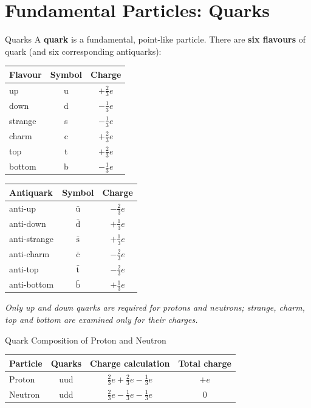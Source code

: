 \section{Fundamental Particles: Quarks}

\begin{definitionbox}{Quarks}
A \textbf{quark} is a fundamental, point-like particle. There are \textbf{six flavours} of quark (and six corresponding antiquarks):
\begin{center}
\renewcommand{\arraystretch}{1.4}
\begin{tabular}{@{} l c c @{}}
\toprule
\textbf{Flavour} & \textbf{Symbol} & \textbf{Charge} \\
\midrule
up    & u & $+\tfrac{2}{3}e$ \\
down  & d & $-\tfrac{1}{3}e$ \\
strange & s & $-\tfrac{1}{3}e$ \\
charm & c & $+\tfrac{2}{3}e$ \\
top   & t & $+\tfrac{2}{3}e$ \\
bottom & b & $-\tfrac{1}{3}e$ \\
\bottomrule
\end{tabular}
\qquad
\begin{tabular}{@{} l c c @{}}
\toprule
\textbf{Antiquark} & \textbf{Symbol} & \textbf{Charge} \\
\midrule
anti-up    & $\bar{\text{u}}$ & $-\tfrac{2}{3}e$ \\
anti-down  & $\bar{\text{d}}$ & $+\tfrac{1}{3}e$ \\
anti-strange & $\bar{\text{s}}$ & $+\tfrac{1}{3}e$ \\
anti-charm & $\bar{\text{c}}$ & $-\tfrac{2}{3}e$ \\
anti-top   & $\bar{\text{t}}$ & $-\tfrac{2}{3}e$ \\
anti-bottom & $\bar{\text{b}}$ & $+\tfrac{1}{3}e$ \\
\bottomrule
\end{tabular}
\end{center}
\vspace{0.3em}
\textit{Only up and down quarks are required for protons and neutrons; strange, charm, top and bottom are examined only for their charges.}
\end{definitionbox}

\begin{keybox}{Quark Composition of Proton and Neutron}
\begin{center}
\renewcommand{\arraystretch}{1.4}
\begin{tabular}{@{} l c c c @{}}
\toprule
\textbf{Particle} & \textbf{Quarks} & \textbf{Charge calculation} & \textbf{Total charge} \\
\midrule
Proton  & uud & $\tfrac{2}{3}e + \tfrac{2}{3}e - \tfrac{1}{3}e$ & $+e$ \\
Neutron & udd & $\tfrac{2}{3}e - \tfrac{1}{3}e - \tfrac{1}{3}e$ & $0$ \\
\bottomrule
\end{tabular}
\end{center}
\end{keybox}


